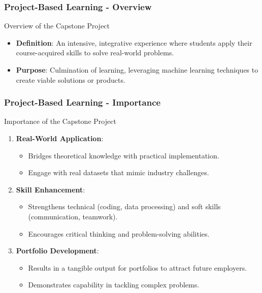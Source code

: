 \documentclass[aspectratio=169]{beamer}
\begin{document}
\begin{frame}[fragile]
    \frametitle{Project-Based Learning - Overview}
    \begin{block}{Overview of the Capstone Project}
        \begin{itemize}
            \item \textbf{Definition}: An intensive, integrative experience where students apply their course-acquired skills to solve real-world problems.
            \item \textbf{Purpose}: Culmination of learning, leveraging machine learning techniques to create viable solutions or products.
        \end{itemize}
    \end{block}
\end{frame}

\begin{frame}[fragile]
    \frametitle{Project-Based Learning - Importance}
    \begin{block}{Importance of the Capstone Project}
        \begin{enumerate}
            \item \textbf{Real-World Application}:
            \begin{itemize}
                \item Bridges theoretical knowledge with practical implementation.
                \item Engage with real datasets that mimic industry challenges.
            \end{itemize}
            \item \textbf{Skill Enhancement}:
            \begin{itemize}
                \item Strengthens technical (coding, data processing) and soft skills (communication, teamwork).
                \item Encourages critical thinking and problem-solving abilities.
            \end{itemize}
            \item \textbf{Portfolio Development}:
            \begin{itemize}
                \item Results in a tangible output for portfolios to attract future employers.
                \item Demonstrates capability in tackling complex problems.
            \end{itemize}
        \end{enumerate}
    \end{block}
\end{frame}
\end{document}
